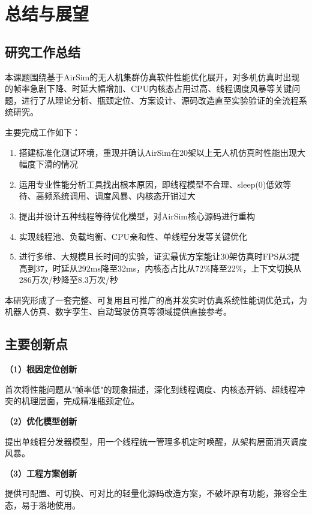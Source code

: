 \section{总结与展望}

\subsection{研究工作总结}

本课题围绕基于AirSim的无人机集群仿真软件性能优化展开，对多机仿真时出现的帧率急剧下降、时延大幅增加、CPU内核态占用过高、线程调度风暴等关键问题，进行了从理论分析、瓶颈定位、方案设计、源码改造直至实验验证的全流程系统研究。

主要完成工作如下：

\begin{enumerate}
    \item 搭建标准化测试环境，重现并确认AirSim在20架以上无人机仿真时性能出现大幅度下滑的情况
    \item 运用专业性能分析工具找出根本原因，即线程模型不合理、sleep(0)低效等待、高频系统调用、调度风暴、内核态开销过大
    \item 提出并设计五种线程等待优化模型，对AirSim核心源码进行重构
    \item 实现线程池、负载均衡、CPU亲和性、单线程分发等关键优化
    \item 进行多维、大规模且长时间的实验，证实最优方案能让30架仿真时FPS从3提高到37，时延从292ms降至32ms，内核态占比从72\%降至22\%，上下文切换从286万次/秒降至8.3万次/秒
\end{enumerate}

本研究形成了一套完整、可复用且可推广的高并发实时仿真系统性能调优范式，为机器人仿真、数字孪生、自动驾驶仿真等领域提供直接参考。

\subsection{主要创新点}

\textbf{（1）根因定位创新}

首次将性能问题从"帧率低"的现象描述，深化到线程调度、内核态开销、超线程冲突的机理层面，完成精准瓶颈定位。

\textbf{（2）优化模型创新}

提出单线程分发器模型，用一个线程统一管理多机定时唤醒，从架构层面消灭调度风暴。

\textbf{（3）工程方案创新}

提供可配置、可切换、可对比的轻量化源码改造方案，不破坏原有功能，兼容全生态，易于落地使用。

